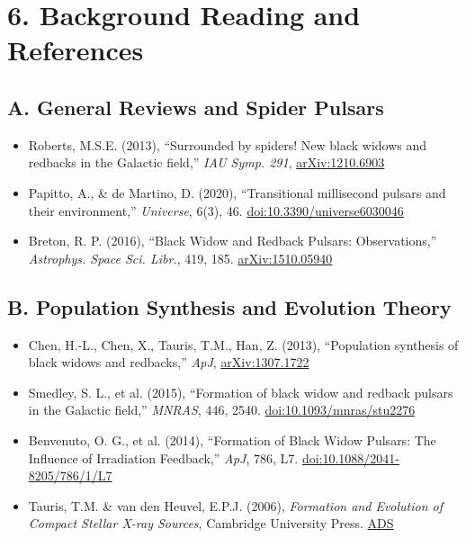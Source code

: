 \documentclass[12pt]{article}
\begin{document}
\section*{6. Background Reading and References}

\subsection*{A. General Reviews and Spider Pulsars}
\begin{itemize}
    \item Roberts, M.S.E. (2013), ``Surrounded by spiders! New black widows and redbacks in the Galactic field,'' \textit{IAU Symp. 291}, \href{https://arxiv.org/abs/1210.6903}{arXiv:1210.6903}
    \item Papitto, A., \& de Martino, D. (2020), ``Transitional millisecond pulsars and their environment,'' \textit{Universe}, 6(3), 46. \href{https://www.mdpi.com/2218-1997/6/3/46}{doi:10.3390/universe6030046}
    \item Breton, R. P. (2016), ``Black Widow and Redback Pulsars: Observations,'' \textit{Astrophys. Space Sci. Libr.}, 419, 185. \href{https://arxiv.org/abs/1510.05940}{arXiv:1510.05940}
\end{itemize}

\subsection*{B. Population Synthesis and Evolution Theory}
\begin{itemize}
    \item Chen, H.-L., Chen, X., Tauris, T.M., Han, Z. (2013), ``Population synthesis of black widows and redbacks,'' \textit{ApJ}, \href{https://arxiv.org/abs/1307.1722}{arXiv:1307.1722}
    \item Smedley, S. L., et al. (2015), ``Formation of black widow and redback pulsars in the Galactic field,'' \textit{MNRAS}, 446, 2540. \href{https://academic.oup.com/mnras/article/446/3/2540/1056016}{doi:10.1093/mnras/stu2276}
    \item Benvenuto, O. G., et al. (2014), ``Formation of Black Widow Pulsars: The Influence of Irradiation Feedback,'' \textit{ApJ}, 786, L7. \href{https://iopscience.iop.org/article/10.1088/2041-8205/786/1/L7}{doi:10.1088/2041-8205/786/1/L7}
    \item Tauris, T.M. \& van den Heuvel, E.P.J. (2006), \textit{Formation and Evolution of Compact Stellar X-ray Sources}, Cambridge University Press. \href{https://ui.adsabs.harvard.edu/abs/2006csxs.book..623T/abstract}{ADS}
\end{itemize}
\end{document}
